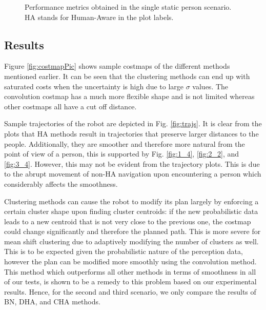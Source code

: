 \begin{figure}
\caption{Performance metrics obtained in the single static person scenario. HA stands for Human-Aware in the plot labels.
}
\label{fig:boxplots_singlePerson}
\end{figure}

\subsection{Results}
\label{sec:results}
Figure \ref{fig:costmapPic} shows sample costmaps of the different methods mentioned earlier. It can be seen that the clustering methods can end up with saturated costs when the uncertainty is high due to large $\sigma$ values. The convolution costmap has a much more flexible shape and is not limited whereas other costmaps all have a cut off distance.

Sample trajectories of the robot are depicted in Fig. \ref{fig:trajs}. It is clear from the plots that HA methods result in trajectories that preserve larger distances to the people. Additionally, they are smoother and therefore more natural from the point of view of a person, this is supported by Fig. \ref{fig:1_4}, \ref{fig:2_2}, and \ref{fig:3_4}. However, this may not be evident from the trajectory plots. This is due to the abrupt movement of non-HA navigation upon encountering a person which considerably affects the smoothness. 

Clustering methods can cause the robot to modify its plan largely by enforcing a certain cluster shape upon finding cluster centroids: if the new probabilistic data leads to a new centroid that is not very close to the previous one, the costmap could change significantly and therefore the planned path. This is more severe for mean shift clustering due to adaptively modifying the number of clusters as well. This is to be expected given the probabilistic nature of the perception data, however the plan can be modified more smoothly using the convolution method. This method which outperforms all other methods in terms of smoothness in all of our tests, is shown to be a remedy to this problem based on our experimental results. Hence, for the second and third scenario, we only compare the results of BN, DHA, and CHA methods.  

